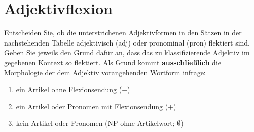 \section{Adjektivflexion}

Entscheiden Sie, ob die unterstrichenen Adjektivformen in den Sätzen in der nachstehenden Tabelle adjektivisch (adj) oder pronominal (pron) flektiert sind.
Geben Sie jeweils den Grund dafür an, dass das zu klassifizierende Adjektiv im gegebenen Kontext so flektiert.
Als Grund kommt \textbf{ausschließlich} die Morphologie der dem Adjektiv vorangehenden Wortform infrage:

\begin{enumerate}\Lf
  \item ein Artikel ohne Flexionsendung ($-$)
  \item ein Artikel oder Pronomen mit Flexionsendung ($+$)
  \item kein Artikel oder Pronomen (NP ohne Artikelwort; $\emptyset$)
\end{enumerate}

